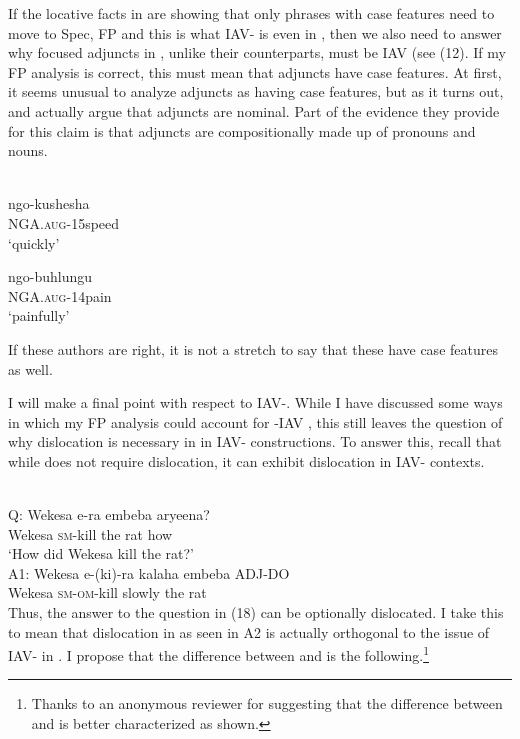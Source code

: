 \documentclass[output=paper
,newtxmath
,modfonts
,nonflat]{langsci/langscibook}
\begin{document}
If the locative facts in  are showing that only phrases with case features need to move to Spec, FP and this is what IAV- is even in , then we also need to answer why focused adjuncts in , unlike their  counterparts, must be IAV (see (12). If my FP analysis is correct, this must mean that  adjuncts have case features. At first, it seems unusual to analyze adjuncts as having case features, but as it turns out, \citet{Halpert2012} and \citet{chengdowning2014} actually argue that  adjuncts are nominal. Part of the evidence they provide for this claim is that  adjuncts are compositionally made up of pronouns and nouns. 

\ea\label{ex:selvanathan:17}
\\
\ea\label{ex:selvanathan:17a}
\gll ngo-kushesha\\
NGA.\textsc{aug}{}-15speed\\
\glt `quickly'

\ex\label{ex:selvanathan:17b}
\gll ngo-buhlungu\\
NGA.\textsc{aug}{}-14pain\\
\glt `painfully'
\z
\z

If these authors are right, it is not a stretch to say that these have case features as well. 

I will make a final point with respect to  IAV-. While I have discussed some ways in which my FP analysis could account for -IAV , this still leaves the question of why dislocation is necessary in  in IAV- constructions. To answer this, recall that while  does not require dislocation, it can exhibit dislocation in IAV- contexts.

\ea\label{ex:selvanathan:18}
\\
Q: \gll Wekesa    e-ra   embeba   aryeena? \\
Wekesa   \textsc{sm}{}-kill   {the rat}    how \\
\glt \-\hspace{.5cm}`How did Wekesa kill the rat?' \\

A1: \gll Wekesa    e-(ki)-ra        kalaha   embeba    ADJ-DO \\
Wekesa   \textsc{sm}{}-\textsc{om}{}-kill    slowly  {the rat} \\
\z
Thus, the answer to the question in (18) can be optionally dislocated. I take this to mean that dislocation in  as seen in A2 is actually orthogonal to the issue of IAV- in . I propose that the difference between  and  is the following.\footnote{Thanks to an anonymous reviewer for suggesting that the difference between  and  is better characterized as shown.}
\end{document}
